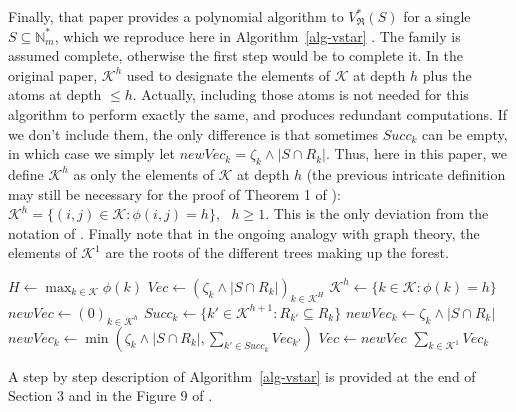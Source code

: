 \documentclass[
  11pt,
  a4paper,
]{article}
\theoremstyle{plain}
\theoremstyle{definition}
\theoremstyle{plain}
\theoremstyle{definition}
\theoremstyle{plain}
\theoremstyle{remark}
\begin{document}
Finally, that paper provides a polynomial algorithm to
\(V^*_{\mathfrak{R}}(S)\) for a single \(S\subseteq\mathbb{N}_m^*\),
which we reproduce here in  Algorithm~\ref{alg-vstar} . The family is
assumed complete, otherwise the first step would be to complete it. In
the original paper, \(\mathcal{K}^h\) used to designate the elements of
\(\mathcal{K}\) at depth \(h\) plus the atoms at depth \(\leq h\).
Actually, including those atoms is not needed for this algorithm to
perform exactly the same, and produces redundant computations. If we
don't include them, the only difference is that sometimes \(Succ_k\) can
be empty, in which case we simply let
\(newVec_k=\zeta_k\wedge|S\cap R_k|\). Thus, here in this paper, we
define \(\mathcal{K}^h\) as only the elements of \(\mathcal{K}\) at
depth \(h\) (the previous intricate definition may still be necessary
for the proof of Theorem 1 of \citet{MR4178188}):
\(\mathcal{K}^h=\{ (i,j)\in\mathcal{K}: \phi(i,j)=h      \}, \:\:\:h\geq 1.\)
This is the only deviation from the notation of \citet{MR4178188}.
Finally note that in the ongoing analogy with graph theory, the elements
of \(\mathcal{K}^1\) are the roots of the different trees making up the
forest.

\begin{algorithm}[htb!]
\caption{Computation of a given $V^*_{\mathfrak{R}}(S)$ with a complete family}
\label{alg-vstar}
\begin{algorithmic}[1]
  \State $ H \gets \max_{k\in\mathcal{K}} \phi(k)  $ 
  \State $Vec\gets (\zeta_{k}\wedge|S\cap R_k|)_{k \in  \mathcal{K}^H}$ 
    \State $\mathcal{K}^h\gets \{ k\in\mathcal{K} : \phi(k) =h  \}$
    \State $newVec\gets (0)_{k \in  \mathcal{K}^h}$
      \State $Succ_k \gets \{ k' \in  \mathcal{K}^{h+1} : R_{k'}\subseteq R_k\}$
        \State $newVec_k \gets \zeta_k\wedge|S\cap R_k|$
      \Else
        \State $newVec_k \gets \min\left( \zeta_{k}\wedge|S\cap R_k| ,  \sum_{k'\in Succ_k} Vec_{k'}   \right)$
      \EndIf
    \EndFor
    \State $Vec\gets newVec$
  \EndFor
  \State\Return $\sum_{k\in\mathcal{K}^1} Vec_k  $
\EndProcedure
\end{algorithmic}
\end{algorithm}

A step by step description of  Algorithm~\ref{alg-vstar}  is provided at
the end of Section 3 and in the Figure 9 of \citet{MR4178188}.
\end{document}

